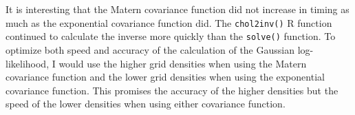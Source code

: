 \documentclass[11pt]{article}
\begin{document}
\begin{flushleft}
	It is interesting that the Matern covariance function did not increase in timing as much as the exponential covariance function did. The \verb|chol2inv()| R function continued to calculate the inverse more quickly than the \verb|solve()| function.
	\newline\newline
	To optimize both speed and accuracy of the calculation of the Gaussian log-likelihood, I would use the higher grid densities when using the Matern covariance function and the lower grid densities when using the exponential covariance function. This promises the accuracy of the higher densities but the speed of the lower densities when using either covariance function.
\end{flushleft}
\end{document}
